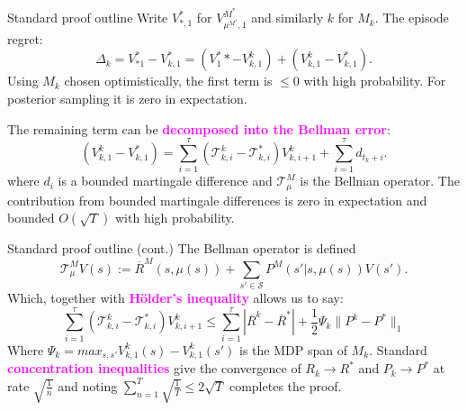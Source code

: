 \documentclass{beamer}
\newcommand{\Sc}{\mathcal{S}}
\newcommand{\Tc}{\mathcal{T}}
\newcommand{\bspace}{\vspace{3mm}}
\newcommand{\hilite}[1]{\textcolor{magenta}{\textbf{#1}}}
\begin{document}
\begin{frame}{Standard proof outline}
Write $V^*_{*,1}$ for $V^{M^*}_{\mu^{M^*}, 1}$ and similarly $k$ for $M_k$.
The episode regret:
$$\Delta_k = V^*_{*1} - V^*_{k,1}
= \left(V^*_{1}* - V^k_{k,1} \right) + \left(V^k_{k,1} - V^*_{k,1} \right) .$$
Using $M_k$ chosen optimistically, the first term is $\le 0$ with high probability.
For posterior sampling it is zero in expectation.
\bspace

The remaining term can be \hilite{decomposed into the Bellman error}:
\begin{equation*}
    \left(V^k_{k,1} - V^*_{k,1} \right) = \sum_{i=1}^\tau \left( \Tc^k_{k,i} - \Tc^*_{k,i} \right) V^k_{k,i+1} + \sum_{i=1}^\tau d_{t_k+i}.
\end{equation*}
where $d_i$ is a bounded martingale difference and $\Tc^M_\mu$ is the Bellman operator.
The contribution from bounded martingale differences is zero in expectation and bounded $O(\sqrt{T})$ with high probability.
\end{frame}

\begin{frame}{Standard proof outline (cont.)}
The Bellman operator is defined
$$\mathcal{T}_{\mu}^{M} V(s) := \overline{R}^{M} (s, \mu(s)) + \sum_{s' \in \Sc} P^{M}(s' | s, \mu(s)) V(s').$$
Which, together with \hilite{H\"{o}lder's inequality} allows us to say:
\begin{equation*}
\label{eq: err sums}
    \sum_{i=1}^\tau \left( \Tc^k_{k,i} - \Tc^*_{k,i} \right) V^k_{k,i+1} \le
        \sum_{i=1}^\tau |\overline{R}^k - \overline{R}^* | + \frac{1}{2} \Psi_k \|P^k - P^* \|_1
\end{equation*}
Where $\Psi_k = max_{s,s'} V^k_{k,1}(s) - V^k_{k,1}(s')$ is the MDP span of $M_k$.
Standard \hilite{concentration inequalities} \cite{weissman2003inequalities} give the convergence of $R_k \rightarrow R^*$ and $P_k \rightarrow P^*$ at rate $\sqrt{\frac{1}{n}}$ and noting $\sum_{n=1}^T \sqrt{\frac{1}{T}} \le 2 \sqrt{T}$ completes the proof.
\end{frame}
\end{document}
